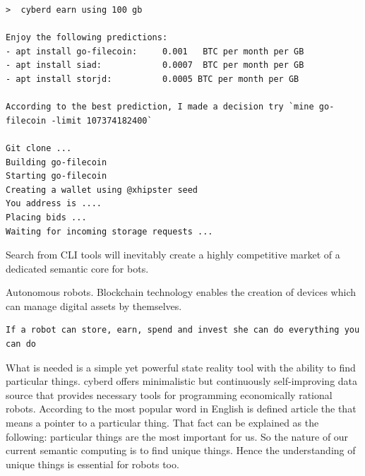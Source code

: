 \documentclass[8pt,oneside]{amsart}
\newcommand{\linkgreen}[2]{\href{#1}{\color{green}{#2}}}
\newcommand{\code}[1]{{\PlayBold #1}}
\begin{document}
\begin{lstlisting}
>  cyberd earn using 100 gb

Enjoy the following predictions:
- apt install go-filecoin:     0.001   BTC per month per GB
- apt install siad:            0.0007  BTC per month per GB
- apt install storjd:          0.0005 BTC per month per GB

According to the best prediction, I made a decision try `mine go-filecoin -limit 107374182400`

Git clone ...
Building go-filecoin
Starting go-filecoin
Creating a wallet using @xhipster seed
You address is ....
Placing bids ...
Waiting for incoming storage requests ...

\end{lstlisting}

Search from CLI tools will inevitably create a highly competitive market of a dedicated semantic core for bots.

\code{Autonomous robots}. Blockchain technology enables the creation of devices which can manage digital assets by themselves.

\begin{lstlisting}
If a robot can store, earn, spend and invest she can do everything you can do
\end{lstlisting}

What is needed is a simple yet powerful state reality tool with the ability to find particular things. \code{cyberd} offers minimalistic but continuously self-improving data source that provides necessary tools for programming economically rational robots. According to \linkgreen{https://github.com/first20hours/google-10000-english}{top-10000 english words} the most popular word in English is defined article \code{the} that means a pointer to a particular thing. That fact can be explained as the following: particular things are the most important for us. So the nature of our current semantic computing is to find unique things. Hence the understanding of unique things is essential for robots too.
\end{document}
